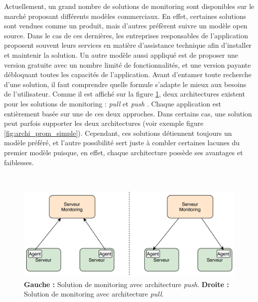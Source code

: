 \noindent
Actuellement, un grand nombre de solutions de monitoring sont disponibles sur le marché proposant différents modèles commerciaux. En effet, certaines solutions sont vendues comme un produit, mais d'autres préfèrent suivre un modèle open source. Dans le cas de ces dernières, les entreprises responsables de l'application proposent souvent leurs services en matière d'assistance technique afin d'installer et maintenir la solution. Un autre modèle aussi appliqué est de proposer une version gratuite avec un nombre limité de fonctionnalités, et une version payante débloquant toutes les capacités de l'application. Avant d'entamer toute recherche d'une solution, il faut comprendre quelle formule s'adapte le mieux aux besoins de l'utilisateur.
Comme il est affiché sur la figure \ref{fig:mon_archi}, deux architectures existent pour les solutions de monitoring : \textit{pull} et \textit{push} \cite{brazil2018prometheus, techhub_monitoring, blog_monitoring, techhub_monitoring}. Chaque application est entièrement basée sur une de ces deux approches. Dans certains cas, une solution peut parfois supporter les deux architectures (voir exemple figure \ref{fig:archi_prom_simple}). Cependant, ces solutions détiennent toujours un modèle préféré, et l'autre possibilité sert juste à combler certaines lacunes du premier modèle puisque, en effet, chaque architecture possède ses avantages et faiblesses.

~

\begin{figure}[ht!]
  \includegraphics[width=\textwidth]{img/state_of_the_art/monitoring_architecture.png}
  \caption{\textbf{Gauche :} Solution de monitoring avec architecture \textit{push}.  \textbf{Droite :} Solution de monitoring avec architecture \textit{pull}.}
  \label{fig:mon_archi}
\end{figure}




